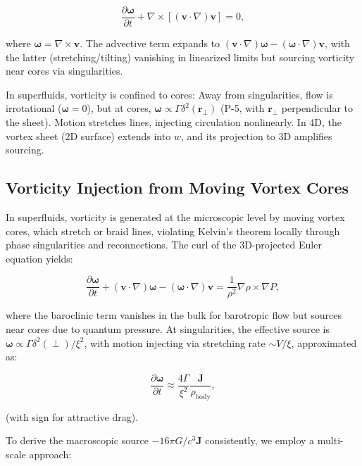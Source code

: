 \documentclass{article}
\begin{document}
\[
\frac{\partial \boldsymbol{\omega}}{\partial t} + \nabla \times [(\mathbf{v} \cdot \nabla) \mathbf{v}] = 0,
\]

where $\boldsymbol{\omega} = \nabla \times \mathbf{v}$. The advective term expands to $(\mathbf{v} \cdot \nabla) \boldsymbol{\omega} - (\boldsymbol{\omega} \cdot \nabla) \mathbf{v}$, with the latter (stretching/tilting) vanishing in linearized limits but sourcing vorticity near cores via singularities.

In superfluids, vorticity is confined to cores: Away from singularities, flow is irrotational ($\boldsymbol{\omega} = 0$), but at cores, $\boldsymbol{\omega} \propto \Gamma \delta^2(\mathbf{r}_\perp)$ (P-5, with $\mathbf{r}_\perp$ perpendicular to the sheet). Motion stretches lines, injecting circulation nonlinearly. In 4D, the vortex sheet (2D surface) extends into $w$, and its projection to 3D amplifies sourcing.

\subsection{Vorticity Injection from Moving Vortex Cores}

In superfluids, vorticity is generated at the microscopic level by moving vortex cores, which stretch or braid lines, violating Kelvin's theorem locally through phase singularities and reconnections. The curl of the 3D-projected Euler equation yields:

\[
\frac{\partial \boldsymbol{\omega}}{\partial t} + (\mathbf{v} \cdot \nabla) \boldsymbol{\omega} - (\boldsymbol{\omega} \cdot \nabla) \mathbf{v} = \frac{1}{\rho^2} \nabla \rho \times \nabla P,
\]

where the baroclinic term vanishes in the bulk for barotropic flow but sources near cores due to quantum pressure. At singularities, the effective source is $\boldsymbol{\omega} \propto \Gamma \delta^2(\perp) / \xi^2$, with motion injecting via stretching rate $\sim V / \xi$, approximated as:

\[
\frac{\partial \boldsymbol{\omega}}{\partial t} \approx \frac{4 \Gamma}{\xi^2} \frac{\mathbf{J}}{\rho_{\text{body}}},
\]

(with sign for attractive drag).

To derive the macroscopic source $-16\pi G / c^3 \mathbf{J}$ consistently, we employ a multi-scale approach:
\end{document}
